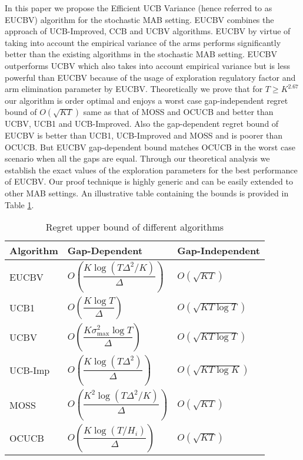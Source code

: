 In this paper we propose the Efficient UCB Variance (hence referred to as EUCBV) algorithm for the stochastic MAB setting. EUCBV combines the approach of UCB-Improved, CCB \citep{liu2016modification} and UCBV algorithms. EUCBV by virtue of taking into account the empirical variance of the arms performs significantly better than the existing algorithms in the stochastic MAB setting. EUCBV outperforms UCBV \citep{audibert2009exploration} which also takes into account empirical variance but is less powerful than EUCBV because of the usage of exploration regulatory factor and arm elimination parameter by EUCBV. Theoretically we prove that for $T\geq K^{2.67}$ our algorithm is order optimal and enjoys a worst case gap-independent regret bound of $O\left( \sqrt{KT} \right)$ same as that of MOSS and OCUCB and better than UCBV, UCB1 and UCB-Improved. Also the gap-dependent regret bound of EUCBV is better than UCB1, UCB-Improved and MOSS and is poorer than OCUCB. But EUCBV gap-dependent bound matches OCUCB in the worst case scenario when all the gaps are equal. Through our theoretical analysis we establish the exact values of the exploration parameters for the best performance of EUCBV. Our proof technique is highly generic and can be easily extended to other MAB settings. An illustrative table containing the bounds is provided in Table \ref{tab:comp-bds}. 

\begin{table}
\caption{Regret upper bound of different algorithms}
\label{tab:comp-bds}
\begin{center}
\begin{tabular}{p{6em}p{12em}p{10em}}
\toprule
Algorithm  & Gap-Dependent & Gap-Independent \\
\hline
EUCBV		& $O\left( \dfrac{K\log (T\Delta^2 /K)}{\Delta}\right)$ & $O\left(\sqrt{KT}\right)$\\
UCB1        & $O\left( \dfrac{K\log T}{\Delta} \right)$ & $O\left(\sqrt{KT\log T}\right)$ \\%
UCBV        & $O\left( \dfrac{K\sigma_{\max}^{2}\log T}{\Delta} \right)$ & $O\left(\sqrt{KT\log T}\right)$ \\
UCB-Imp 		& $O\left( \dfrac{K\log (T\Delta^2)}{\Delta} \right)$ & $O\left(\sqrt{KT\log K}\right)$ \\%
MOSS	     	& $O\left( \dfrac{K^2\log (T\Delta^2 /K)}{\Delta}\right)$ & $O\left(\sqrt{KT}\right)$\\%
OCUCB     	& $O\left( \dfrac{K\log (T/ H_{i})}{\Delta}\right)$ & $O\left(\sqrt{KT}\right)$\\\midrule
\end{tabular}
\end{center}
\vspace*{-2em}
\end{table}


